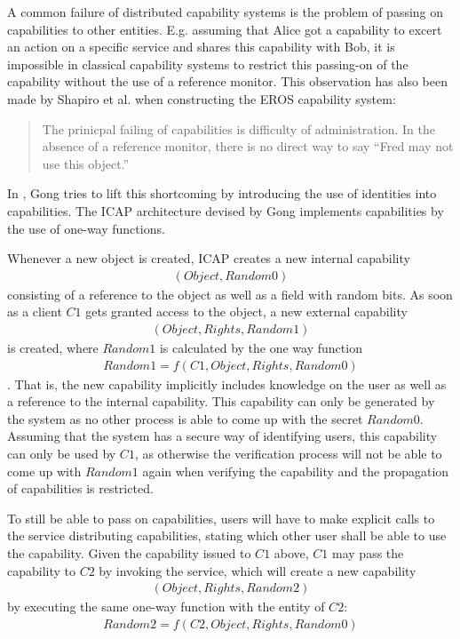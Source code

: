 A common failure of distributed capability systems is the problem of passing on capabilities to other entities.
E.g. assuming that Alice got a capability to excert an action on a specific service and shares this capability with Bob, it is impossible in classical capability systems to restrict this passing-on of the capability without the use of a reference monitor.
This observation has also been made by Shapiro et al. when constructing the EROS capability system:
\begin{quote}
    The prinicpal failing of capabilities is difficulty of administration.
    In the absence of a reference monitor, there is no direct way to say ``Fred may not use this object.'' \cite{shapiro1999eros}
\end{quote}

In \cite{gong1989secure}, Gong tries to lift this shortcoming by introducing the use of identities into capabilities.
The ICAP architecture devised by Gong implements capabilities by the use of one-way functions.

Whenever a new object is created, ICAP creates a new internal capability
\begin{align*}
    (Object, Random0)
\end{align*}
consisting of a reference to the object as well as a field with random bits.
As soon as a client $C1$ gets granted access to the object, a new external capability
\begin{align*}
    (Object, Rights, Random1)
\end{align*}
is created, where $Random1$ is calculated by the one way function
\begin{align*}
    Random1 = f(C1, Object, Rights, Random0)
\end{align*}.
That is, the new capability implicitly includes knowledge on the user as well as a reference to the internal capability.
This capability can only be generated by the system as no other process is able to come up with the secret $Random0$.
Assuming that the system has a secure way of identifying users, this capability can only be used by $C1$, as otherwise the verification process will not be able to come up with $Random1$ again when verifying the capability and the propagation of capabilities is restricted.

To still be able to pass on capabilities, users will have to make explicit calls to the service distributing capabilities, stating which other user shall be able to use the capability.
Given the capability issued to $C1$ above, $C1$ may pass the capability to $C2$ by invoking the service, which will create a new capability 
\begin{align*}
    (Object, Rights, Random2)
\end{align*}
by executing the same one-way function with the entity of $C2$:
\begin{align*}
    Random2 = f(C2, Object, Rights, Random0)
\end{align*}

